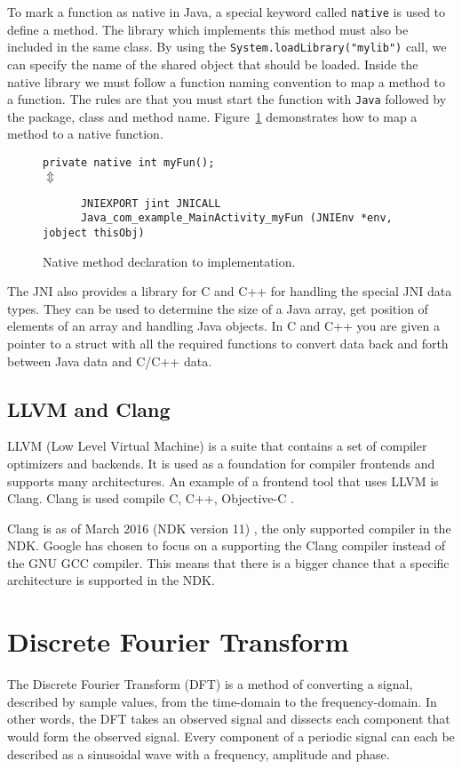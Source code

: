 To mark a function as native in Java, a special keyword called \texttt{native} is used to define a method. The library which implements this method must also be included in the same class. By using the \texttt{System.loadLibrary("mylib")} call, we can specify the name of the shared object that should be loaded. Inside the native library we must follow a function naming convention to map a method to a function. The rules are that you must start the function with \texttt{Java} followed by the package, class and method name. Figure~\ref{fig:native} demonstrates how to map a method to a native function.

\begin{figure}
\begin{center}
    \texttt{private native int myFun();}\\
    $\Updownarrow$
    \begin{verbatim}
      JNIEXPORT jint JNICALL
      Java_com_example_MainActivity_myFun (JNIEnv *env, jobject thisObj)
    \end{verbatim}
\end{center}
\caption{Native method declaration to implementation.}
\label{fig:native}
\end{figure}

The JNI also provides a library for C and C++ for handling the special JNI data types. They can be used to determine the size of a Java array, get position of elements of an array and handling Java objects. In C and C++ you are given a pointer to a struct with all the required functions to convert data back and forth between Java data and C/C++ data.

\subsection{LLVM and Clang}
LLVM (Low Level Virtual Machine) is a suite that contains a set of compiler optimizers and backends. It is used as a foundation for compiler frontends and supports many architectures. An example of a frontend tool that uses LLVM is Clang. Clang is used compile C, C++, Objective-C \cite{clang:comp}.

Clang is as of March 2016 (NDK version 11) \cite{android:ndk:revision}, the only supported compiler in the NDK. Google has chosen to focus on a supporting the Clang compiler instead of the GNU GCC compiler. This means that there is a bigger chance that a specific architecture is supported in the NDK.

\section{Discrete Fourier Transform}
The Discrete Fourier Transform (DFT) is a method of converting a signal, described by sample values, from the time-domain to the frequency-domain. In other words, the DFT takes an observed signal and dissects each component that would form the observed signal. Every component of a periodic signal can each be described as a sinusoidal wave with a frequency, amplitude and phase.

